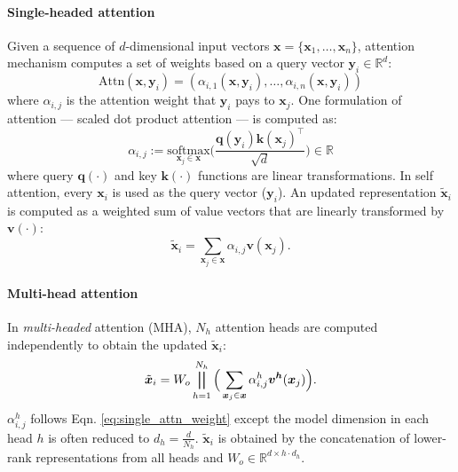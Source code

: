 \documentclass[11pt,a4paper]{article}
\begin{document}
\paragraph{Single-headed attention}
Given a sequence of $d$-dimensional input vectors  $\bm{x} =\{ \bm{x}_1,\ldots,\bm{x}_n \}$, attention mechanism computes a set of weights based on a query vector $\bm{y}_i \in \mathbb{R}^d$:
\begin{equation}
\label{eq:single_attention_vector}
  \text{Attn}(\bm{x},\bm{y}_i) =  (\alpha_{i,1}(\bm{x},\bm{y}_i),\ldots,\alpha_{i,n}(\bm{x},\bm{y}_i))
\end{equation}
where $\alpha_{i,j}$ is the attention weight that $\bm{y}_i$ pays to $\bm{x}_j$. One formulation of attention --- scaled dot product attention --- is computed as:
\begin{equation}
\label{eq:single_attn_weight}
    \alpha_{i,j} := \underset{\bm{x}_j \in \bm{x}}{\text{softmax}}
    \Big(\frac{\bm{q}(\bm{y}_i) \bm{k}(\bm{x}_j)^\top}{\sqrt{d}} \Big) \in \mathbb{R}
\end{equation}
where query  $\bm{q}(\cdot)$ and key  $\bm{k}(\cdot)$ functions are linear transformations.  In self attention, every $\bm{x}_i$ is used as the query vector ($\bm{y}_i$). An updated representation $\tilde{\bm{x}}_i$ is computed as a weighted sum of value vectors that are linearly transformed by $\bm{v}(\cdot)$:
\begin{equation}
\label{eq:single_attention_update}
    \tilde{\bm{x}}_i= \sum_{\bm{x}_j \in \bm{x}} \alpha_{i,j}\bm{v}(\bm{x}_j).
\end{equation} 

\paragraph{Multi-head attention} In \textit{multi-headed} attention (MHA), $N_h$   attention heads are computed independently to obtain the updated $\tilde{\bm{x}}_i$: 
\begin{equation}
\label{eq:multi_head_attention}
    \tilde{\bm{x}}_i = W_o \bigparallel_{h=1}^{N_h} \Big( \sum_{\bm{x}_j \in \bm{x}} \alpha^h_{i,j}\bm{v^h}(\bm{x}_j)\Big).
\end{equation}
$\alpha^h_{i,j}$ follows Eqn. \ref{eq:single_attn_weight} except the model dimension in each head $h$ is often reduced to $d_h=\frac{d}{N_h}$. %
 $\tilde{\bm{x}}_i$ is obtained by the concatenation of lower-rank representations from all heads and $W_o \in \mathbb{R}^{  d  \times h \cdot d_h}$. 
\end{document}
